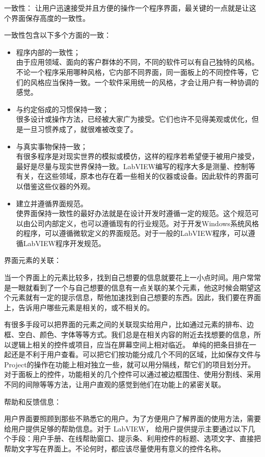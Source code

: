 一致性：
让用户迅速接受并且方便的操作一个程序界面，最关键的一点就是让这个界面保存高度的一致性。

一致性包含以下多个方面的一致：
\begin{itemize}
\item 程序内部的一致性；\\
由于应用领域、面向的客户群体的不同，不同的软件可以有自己独特的风格。不论一个程序采用哪种风格，它内部不同界面，同一面板上的不同控件等，它们的风格应当保持一致。一个软件采用统一的风格，才会让用户有一种协调的感觉。
\item 与约定俗成的习惯保持一致；\\
很多设计或操作方法，已经被大家广为接受。它们也许不见得美观或优化，但是一旦习惯养成了，就很难被改变了。
\item 与真实事物保持一致；\\
有很多程序是对现实世界的模拟或模仿，这样的程序若希望便于被用户接受，最好是尽量与现实世界保持一致。LabVIEW编写的程序大多是测量、控制等有关，在这些领域，原本也存在着一些相关的仪器或设备。因此软件的界面可以借鉴这些仪器的外观。
\item 建立并遵循界面规范。\\
使界面保持一致性的最好办法就是在设计开发时遵循一定的规范。这个规范可以由公司内部定义，也可以遵循现有的行业规范。对于开发Windows系统风格的程序，可以遵循微软定义的界面规范。对于一般的LabVIEW程序，可以遵循LabVIEW程序开发规范。
\end{itemize}

界面元素的关联：

当一个界面上的元素比较多，找到自己想要的信息就要花上一小点时间。用户常常是一眼就看到了一个与自己想要的信息有一点关联的某个元素，他这时候会期望这个元素就有一定的提示信息，帮他加速找到自己想要的东西。因此，我们要在界面上，告诉用户哪些元素是相关的，或不相关的。

有很多手段可以把界面的元素之间的关联现实给用户，比如通过元素的排布、边框、空白、颜色、字体等等方式。我们总是在相关内容的附近去找想要的信息，所以逻辑上相关的控件或项目，应当在屏幕空间上相对临近。
单纯的把条目排在一起还是不利于用户查看。可以把它们按功能分成几个不同的区域，比如保存文件与 Project的操作在功能上相对独立一些，就可以用分隔线，帮它们的项目划分开。对于面板上的控件，功能相关的几个控件可以通过被边框围住、使用分割线、采用不同的间隙等等方法，让用户直观的感觉到他们在功能上的紧密关联。

帮助和反馈信息：

用户界面要照顾到那些不熟悉它的用户。为了方便用户了解界面的使用方法，需要给用户提供足够的帮助信息。对于 LabVIEW， 给用户提供提示主要通过以下几个手段：用户手册、在线帮助窗口、提示条、利用控件的标题、选项文字、直接把帮助文字写在界面上。不论何时，都应该尽量使用有意义的控件名称。

